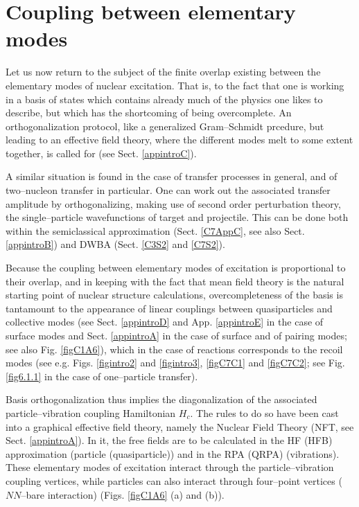 \section{Coupling between elementary modes}\label{C1S4}
Let us now return to the subject of the finite overlap existing between the elementary modes of nuclear excitation. That is, to the fact that one is working in a basis of states which contains already much of the physics one likes to describe, but which has the shortcoming of being overcomplete. An orthogonalization protocol, like a generalized Gram--Schmidt prcedure, but leading to an effective field theory, where the different modes melt to some extent together, is called for (see Sect. \ref{appintroC}).

A similar situation is found in the case of transfer processes in general, and of two--nucleon transfer in particular. One can work out the associated transfer amplitude by orthogonalizing, making use of second order perturbation theory, the single--particle wavefunctions of target and projectile. This can be done both within the semiclassical approximation (Sect. \ref{C7AppC}, see also Sect. \ref{appintroB}) and DWBA (Sect. \ref{C3S2} and \ref{C7S2}). 

Because the coupling between elementary modes of excitation is proportional to their overlap, and in keeping with the fact that mean field theory is the natural starting point of nuclear structure calculations, overcompleteness of the basis is tantamount to the appearance of linear couplings between quasiparticles and collective modes (see Sect. \ref{appintroD} and App. \ref{appintroE} in the case of surface modes and Sect. \ref{appintroA} in the case of surface and of pairing modes; see also Fig. \ref{figC1A6}), which in the case of reactions corresponds to the recoil modes (see e.g. Figs. \ref{figintro2} and \ref{figintro3}, \ref{figC7C1} and \ref{figC7C2}; see Fig. \ref{fig6.1.1} in the case of one--particle transfer).


Basis orthogonalization thus implies the diagonalization of the associated particle--vibration coupling Hamiltonian $H_c$. The rules to do so have been cast into a graphical effective field theory, namely the Nuclear Field Theory (NFT, see Sect. \ref{appintroA}). In it, the free fields are to be calculated in the HF (HFB) approximation (particle (quasiparticle)) and in the RPA (QRPA) (vibrations). These elementary modes of excitation interact through the particle--vibration coupling vertices, while particles can also interact through four--point vertices ($NN$--bare interaction) (Figs. \ref{figC1A6} (a) and (b)).


